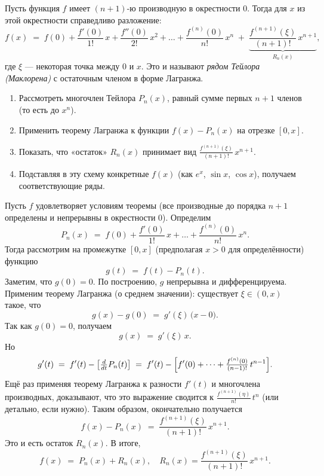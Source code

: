 
\begin{customtheorem}
	Пусть функция $f$ имеет $(n+1)$-ю производную в окрестности $0$. Тогда для $x$
	из этой окрестности справедливо разложение:
	\[
		f(x)
		\;=\;
		f(0)
		+ \frac{f'(0)}{1!}\,x
		+ \frac{f''(0)}{2!}\,x^2
		+ \dots
		+ \frac{f^{(n)}(0)}{n!}\,x^n
		\;+\;
		\underbrace{
		\frac{f^{(n+1)}(\xi)}{(n+1)!}\,x^{n+1}
		}_{R_{n}(x)},
	\]
	где $\xi$ — некоторая точка между $0$ и $x$.
	Это и называют \emph{рядом Тейлора (Маклорена)} с остаточным членом в форме Лагранжа.
\end{customtheorem}

\begin{proofplan}
	\begin{enumerate}
		\item Рассмотреть многочлен Тейлора $P_n(x)$, равный сумме первых $n+1$ членов (то есть до $x^n$).
		\item Применить теорему Лагранжа к функции $f(x)-P_n(x)$ на отрезке $[0,x]$.
		\item Показать, что «остаток» $R_n(x)$ принимает вид
		      $\tfrac{f^{(n+1)}(\xi)}{(n+1)!}\,x^{n+1}$.
		\item Подставляя в эту схему конкретные $f(x)$ (как $e^x$, $\sin x$, $\cos x$), получаем соответствующие ряды.
	\end{enumerate}
\end{proofplan}

\begin{customproof}
	Пусть $f$ удовлетворяет условиям теоремы (все производные до порядка $n+1$
	определены и непрерывны в окрестности $0$). Определим
	\[
		P_n(x) \;=\; f(0)
		+ \frac{f'(0)}{1!}\,x
		+ \dots
		+ \frac{f^{(n)}(0)}{n!}\,x^n.
	\]
	Тогда рассмотрим на промежутке $[0,x]$ (предполагая $x>0$ для определённости) функцию
	\[
		g(t) \;=\; f(t) - P_n(t).
	\]
	Заметим, что $g(0)=0$. По построению, $g$ непрерывна и дифференцируема.
	Применим теорему Лагранжа (о среднем значении): существует $\xi\in(0,x)$ такое, что
	\[
		g(x) - g(0) \;=\; g'(\xi)\,\bigl(x - 0\bigr).
	\]
	Так как $g(0)=0$, получаем
	\[
		g(x) \;=\; g'(\xi)\,x.
	\]
	Но
	\[
		g'(t)
		\;=\; f'(t)
		- \bigl[\tfrac{d}{dt}P_n(t)\bigr]
		\;=\; f'(t)
		- \Bigl[
		f'(0)
		+ \dots
		+ \tfrac{f^{(n)}(0)}{(n-1)!}\,t^{n-1}
		\Bigr].
	\]
	Ещё раз применяя теорему Лагранжа к разности $f'(t)$ и многочлена производных,
	доказывают, что это выражение сводится к $\tfrac{f^{(n+1)}(\eta)}{n!}\,t^n$ (или детально, если нужно).
	Таким образом, окончательно получается
	\[
		f(x) - P_n(x)
		\;=\;
		\frac{f^{(n+1)}(\xi)}{(n+1)!}\,x^{n+1}.
	\]
	Это и есть остаток $R_n(x)$.
	В итоге,
	\[
		f(x)
		\;=\;
		P_n(x) + R_n(x),
		\quad
		R_n(x) = \frac{f^{(n+1)}(\xi)}{(n+1)!}\,x^{n+1}.
	\]
\end{customproof}

